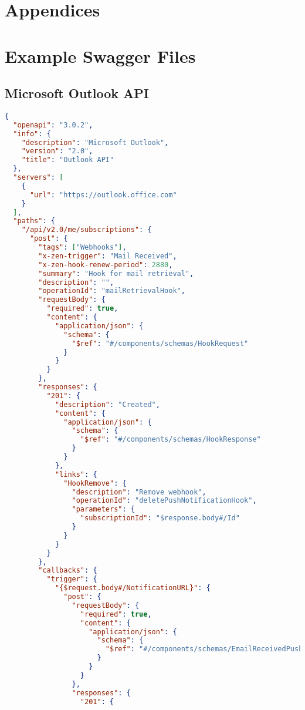 \appendix
{}
\section*{Appendices}
\section{Example Swagger Files}
\subsection{Microsoft Outlook API}
\begin{lstlisting}[language=json,basicstyle=\ttfamily\tiny,numberstyle=\tiny]
{
  "openapi": "3.0.2",
  "info": {
    "description": "Microsoft Outlook",
    "version": "2.0",
    "title": "Outlook API"
  },
  "servers": [
    {
      "url": "https://outlook.office.com"
    }
  ],
  "paths": {
    "/api/v2.0/me/subscriptions": {
      "post": {
        "tags": ["Webhooks"],
        "x-zen-trigger": "Mail Received",
        "x-zen-hook-renew-period": 2880,
        "summary": "Hook for mail retrieval",
        "description": "",
        "operationId": "mailRetrievalHook",
        "requestBody": {
          "required": true,
          "content": {
            "application/json": {
              "schema": {
                "$ref": "#/components/schemas/HookRequest"
              }
            }
          }
        },
        "responses": {
          "201": {
            "description": "Created",
            "content": {
              "application/json": {
                "schema": {
                  "$ref": "#/components/schemas/HookResponse"
                }
              }
            },
            "links": {
              "HookRemove": {
                "description": "Remove webhook",
                "operationId": "deletePushNotificationHook",
                "parameters": {
                  "subscriptionId": "$response.body#/Id"
                }
              }
            }
          }
        },
        "callbacks": {
          "trigger": {
            "{$request.body#/NotificationURL}": {
              "post": {
                "requestBody": {
                  "required": true,
                  "content": {
                    "application/json": {
                      "schema": {
                        "$ref": "#/components/schemas/EmailReceivedPushContent"
                      }
                    }
                  }
                },
                "responses": {
                  "201": {

\end{lstlisting}
